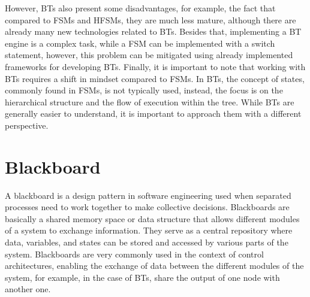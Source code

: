 However, BTs also present some disadvantages, for example, the fact that compared to FSMs and HFSMs, they are much less mature, although there are already many new technologies related to BTs. Besides that, implementing a BT engine is a complex task, while a FSM can be implemented with a switch statement, however, this problem can be mitigated using already implemented frameworks for developing BTs. Finally, it is important to note that working with BTs requires a shift in mindset compared to FSMs. In BTs, the concept of states, commonly found in FSMs, is not typically used, instead, the focus is on the hierarchical structure and the flow of execution within the tree. While BTs are generally easier to understand, it is important to approach them with a different perspective.

\section{Blackboard}

A blackboard \cite{BlackboardDesignPattern} is a design pattern in software engineering used when separated processes need to work together to make collective decisions. Blackboards are basically a shared memory space or data structure that allows different modules of a system to exchange information. They serve as a central repository where data, variables, and states can be stored and accessed by various parts of the system. Blackboards are very commonly used in the context of control architectures, enabling the exchange of data between the different modules of the system, for example, in the case of BTs, share the output of one node with another one.
